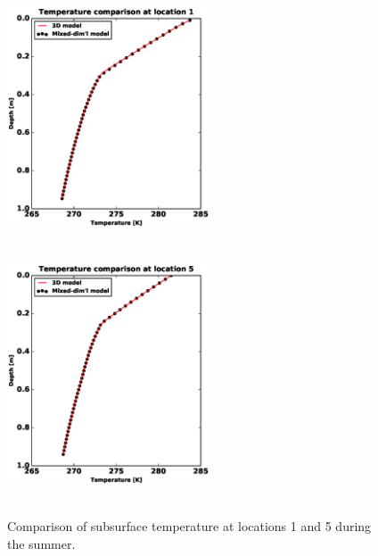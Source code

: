 \documentclass[review,11pt]{elsarticle}
\begin{document}
\begin{figure}[!htpb]
\centering
\includegraphics[height = 7.5cm, width=6cm]{figures/comparison/regular/ss-temp/comp-temp-loc1-cycle0020.eps}
\includegraphics[height = 7.5cm, width=6cm]{figures/comparison/regular/ss-temp/comp-temp-loc5-cycle0020.eps}
\caption{Comparison of subsurface temperature at locations 1 and 5 during the summer.}
\label{ss-temp-comp}
\end{figure}
\end{document}
